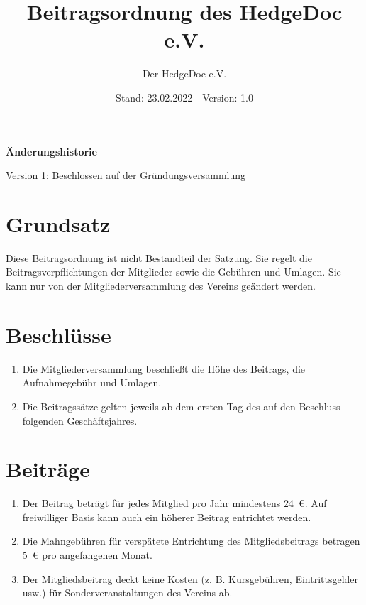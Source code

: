 \documentclass[12pt,paper=a4,ngerman]{scrreprt}
\author{Der HedgeDoc e.V.}
\title{Beitragsordnung des HedgeDoc e.V.}
\date{Stand: 23.02.2022 - Version: 1.0}
\begin{document}
	\maketitle
	
	\textbf{Änderungshistorie}
	\begin{description}
		\item
			Version 1: Beschlossen auf der Gründungsversammlung
	\end{description}
	\newpage
	
	\section{Grundsatz}
    	Diese Beitragsordnung ist nicht Bestandteil der Satzung. Sie regelt die Beitragsverpflichtungen der Mitglieder sowie die Gebühren und Umlagen. Sie kann nur von der Mitgliederversammlung des Vereins geändert werden.
	
	\section{Beschlüsse}
	\begin{enumerate}
	    \item
    	    Die Mitgliederversammlung beschließt die Höhe des Beitrags, die Aufnahmegebühr und Umlagen.
        \item 
    	    Die Beitragssätze gelten jeweils ab dem ersten Tag des auf den Beschluss folgenden Geschäftsjahres.
    \end{enumerate}
    	    
    \section{Beiträge}
    \begin{enumerate}
        \item
            Der Beitrag beträgt für jedes Mitglied pro Jahr mindestens 24 €. Auf freiwilliger Basis kann auch ein höherer Beitrag entrichtet werden.
        \item
            \label{sec:beiträge:mahngebühren}
            Die Mahngebühren für verspätete Entrichtung des Mitgliedsbeitrags betragen 5 € pro angefangenen Monat.
        \item
            Der Mitgliedsbeitrag deckt keine Kosten (z. B. Kursgebühren, Eintrittsgelder usw.) für Sonderveranstaltungen des Vereins ab.
    \end{enumerate}
    	    
\end{document}
